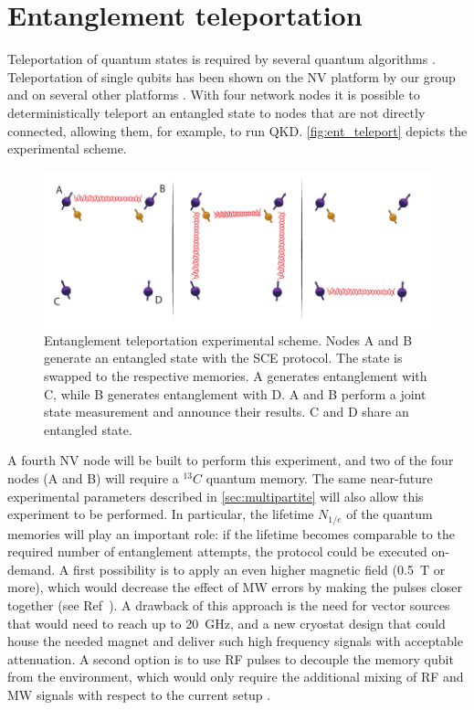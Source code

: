 \documentclass[a4paper]{article}
\begin{document}

\section{Entanglement teleportation}
\label{sec:teleportation}
Teleportation of quantum states is required by several quantum algorithms . Teleportation of single qubits has been shown on the NV platform by our group \cite{Pfaff2014} and on several other platforms \cite{Takeda2013, Wang2015, Valivarthi2016}.
With four network nodes it is possible to deterministically teleport an entangled state to nodes that are not directly connected, allowing them, for example, to run \ac{QKD}. \autoref{fig:ent_teleport} depicts the experimental scheme. 

\begin{figure}
	\includegraphics[width=\textwidth]{images/figure5}
	\caption{Entanglement teleportation experimental scheme. Nodes A and B generate an entangled state with the \ac{SCE} protocol. The state is swapped to the respective memories. A generates entanglement with C, while B generates entanglement with D. A and B perform a joint state measurement and announce their results. C and D share an entangled state. }
	\label{fig:ent_teleport}
\end{figure}

A fourth NV node will be built to perform this experiment, and two of the four nodes (A and B) will require a ${}^{13}C$ quantum memory. The same near-future experimental parameters described in \autoref{sec:multipartite} will also allow this experiment to be performed. In particular, the lifetime $N_{1/e}$ of the quantum memories will play an important role: if the lifetime becomes comparable to the required number of entanglement attempts, the protocol could be executed on-demand. A first possibility is to apply an even higher magnetic field (\SI{0.5}{T} or more), which would decrease the effect of \ac{MW} errors by making the pulses closer together (see Ref~\cite{Kalb2017}). A drawback of this approach is the need for vector sources that would need to reach up to \SI{20}{GHz}, and a new cryostat design that could house the needed magnet and deliver such high frequency signals with acceptable attenuation.
A second option is to use \ac{RF} pulses to decouple the memory qubit from the environment, which would only require the additional mixing of \ac{RF} and \ac{MW} signals with respect to the current setup \cite{Bradley2018}. 
\end{document}
